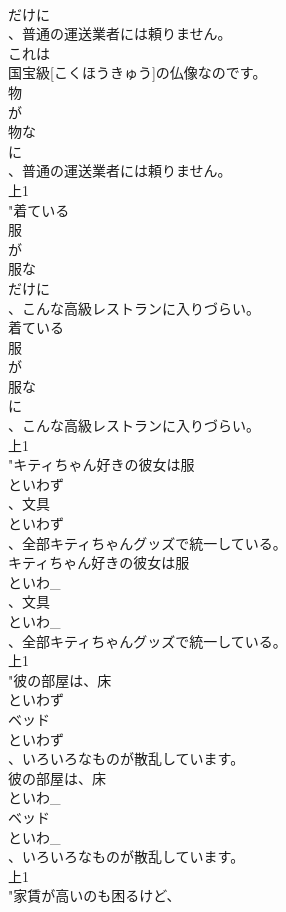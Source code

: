 \documentclass[8pt]{extreport}
\begin{document}
\begin{CJK}{UTF8}{min}
\\	だけに
\\	、普通の運送業者には頼りません。
\\	これは
\\	国宝級[こくほうきゅう]の仏像なのです。
\\	物
\\	が
\\	物な
\\	に
\\	、普通の運送業者には頼りません。
\\	上1
\\	"着ている
\\	服
\\	が
\\	服な
\\	だけに
\\	、こんな高級レストランに入りづらい。
\\	着ている
\\	服
\\	が
\\	服な
\\	に
\\	、こんな高級レストランに入りづらい。
\\	上1
\\	"キティちゃん好きの彼女は服
\\	といわず
\\	、文具
\\	といわず
\\	、全部キティちゃんグッズで統一している。
\\	キティちゃん好きの彼女は服
\\	といわ_
\\	、文具
\\	といわ_
\\	、全部キティちゃんグッズで統一している。
\\	上1
\\	"彼の部屋は、床
\\	といわず
\\	ベッド
\\	といわず
\\	、いろいろなものが散乱しています。
\\	彼の部屋は、床
\\	といわ_
\\	ベッド
\\	といわ_
\\	、いろいろなものが散乱しています。
\\	上1
\\	"家賃が高いのも困るけど、

\end{CJK}
\end{document}
